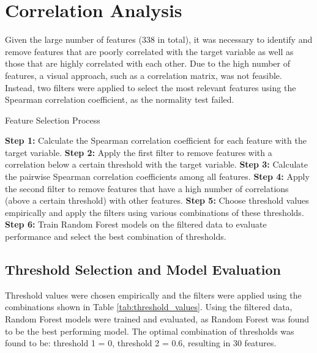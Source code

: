 \section{Correlation Analysis}

Given the large number of features (338 in total), it was necessary to identify and remove features that are poorly correlated with
the target variable as well as those that are highly correlated with each other. Due to the high number of features, a visual approach,
such as a correlation matrix, was not feasible. Instead, two filters were applied to select the most
relevant features using the Spearman correlation coefficient, as the normality test failed.

\begin{algorithm}
    \caption{Feature Selection Process}
    \begin{algorithmic}[1]
        \State \textbf{Step 1:} Calculate the Spearman correlation coefficient for each feature with the target variable.
        \State \textbf{Step 2:} Apply the first filter to remove features with a correlation below a certain threshold with the target variable.
        \State \textbf{Step 3:} Calculate the pairwise Spearman correlation coefficients among all features.
        \State \textbf{Step 4:} Apply the second filter to remove features that have a high number of correlations (above a certain threshold)
        with other features.
        \State \textbf{Step 5:} Choose threshold values empirically and apply the filters using various combinations of these thresholds.
        \State \textbf{Step 6:} Train Random Forest models on the filtered data to evaluate performance and select the best combination of thresholds.
    \end{algorithmic}
\end{algorithm}

\subsection{Threshold Selection and Model Evaluation}

Threshold values were chosen empirically and the filters were applied using the combinations shown in Table \ref{tab:threshold_values}.
Using the filtered data, Random Forest models were trained and evaluated, as Random Forest was found to be the best performing model.
The optimal combination of thresholds was found to be: threshold 1 = 0, threshold 2 = 0.6, resulting in 30 features.

